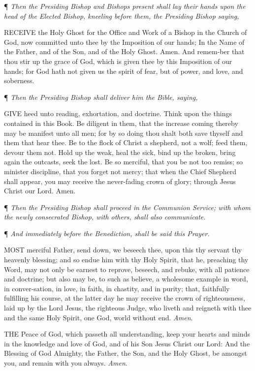 ¶
\emph{Then the Presiding Bishop and Bishops present shall lay their hands
upon the head of the Elected Bishop, kneeling before them, the Presiding
Bishop saying,}

RECEIVE
the Holy Ghost for the Office and Work of a Bishop in the Church of God,
now committed unto thee by the Imposition of our hands; In the Name of
the Father, and of the Son, and of the Holy Ghost. Amen. And remem-ber
that thou stir up the grace of God, which is given thee by this Imposition
of our hands; for God hath not given us the spirit of fear, but of power,
and love, and soberness.

¶ \emph{Then the Presiding Bishop shall
deliver him the Bible, saying,}

GIVE heed unto reading,
exhortation, and doctrine. Think upon the things contained in this Book.
Be diligent in them, that the increase coming thereby may be manifest
unto all men; for by so doing thou shalt both save thyself and them that
hear thee. Be to the flock of Christ a shepherd, not a wolf; feed them,
devour them not. Hold up the weak, heal the sick, bind up the broken,
bring again the outcasts, seek the lost. Be so merciful, that you be not
too remiss; so minister discipline, that you forget not mercy; that when
the Chief Shepherd shall appear, you may receive the never-fading crown
of glory; through Jesus Christ our Lord. Amen.

¶ \emph{Then the Presiding
Bishop shall proceed in the Communion Service; with whom the newly consecrated
Bishop, with others, shall also communicate.}

¶ \emph{And immediately
before the Benediction, shall be said this Prayer.}

MOST merciful Father, send
down, we beseech thee, upon this thy servant thy heavenly blessing; and
so endue him with thy Holy Spirit, that he, preaching thy Word, may not
only be earnest to reprove, beseech, and rebuke, with all patience and
doctrine; but also may be, to such as believe, a wholesome example in
word, in conver-sation, in love, in faith, in chastity, and in purity;
that, faithfully fulfilling his course, at the latter day he may receive
the crown of righteousness, laid up by the Lord Jesus, the righteous Judge,
who liveth and reigneth with thee and the same Holy Spirit, one God, world
without end. \emph{Amen}.

THE Peace of God, which
passeth all understanding, keep your hearts and minds in the knowledge
and love of God, and of his Son Jesus Christ our Lord: And the Blessing
of God Almighty, the Father, the Son, and the Holy Ghost, be amongst you,
and remain with you always. \emph{Amen}.

